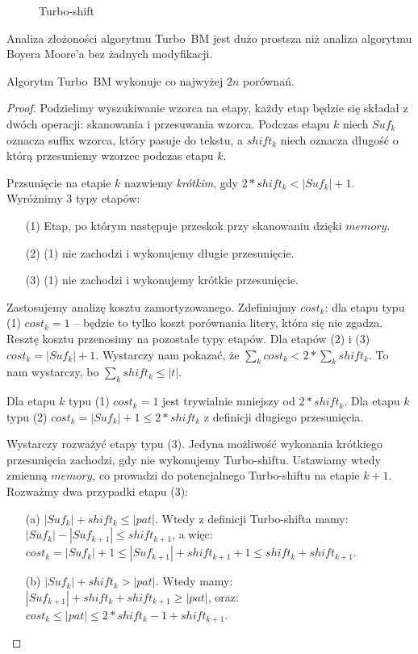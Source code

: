 \begin{figure}[h]
		
  \caption{Turbo-shift}
  \label{turboshift}
\end{figure}

Analiza złożoności algorytmu Turbo~BM jest dużo prostsza niż analiza algorytmu Boyera Moore'a bez żadnych modyfikacji.

\begin{theorem}{}{}
	Algorytm Turbo~BM wykonuje co najwyżej $2n$ porównań.
\end{theorem}

\begin{proof}
	Podzielimy wyszukiwanie wzorca na etapy, każdy etap będzie się składał z dwóch operacji: skanowania i przesuwania wzorca. Podczas etapu $k$ niech $Suf_k$ oznacza suffix wzorca, który pasuje do tekstu, a $shift_k$ niech oznacza długość o którą przesuniemy wzorzec podczas etapu $k$.

	Przsunięcie na etapie $k$ nazwiemy \emph{krótkim}, gdy $2*shift_k < |Suf_k| + 1$. Wyróżnimy 3 typy etapów:
	\begin{itemize}
		\item[(1)] Etap, po którym następuje przeskok przy skanowaniu dzięki $memory$.
		\item[(2)] (1) nie zachodzi i wykonujemy długie przesunięcie.
		\item[(3)] (1) nie zachodzi i wykonujemy krótkie przesunięcie. 
	\end{itemize}

	Zastosujemy analizę kosztu zamortyzowanego. Zdefiniujmy $cost_k$: dla etapu typu (1) $cost_k = 1$ -- będzie to tylko koszt porównania litery, która się nie zgadza. Resztę kosztu przenosimy na pozostałe typy etapów. Dla etapów (2) i (3) $cost_k = |Suf_k| + 1$. Wystarczy nam pokazać, że $\sum_k cost_k < 2* \sum_k shift_k$. To nam wystarczy, bo $\sum_k shift_k \leq |t|$.

	Dla etapu $k$ typu (1) $cost_k = 1$ jest trywialnie mniejszy od $2 * shift_k$. Dla etapu $k$ typu (2) $cost_k = |Suf_k| + 1 \leq 2 * shift_k$ z definicji długiego przesunięcia.

	Wystarczy rozważyć etapy typu (3). Jedyna możliwość wykonania krótkiego przesunięcia zachodzi, gdy nie wykonujemy Turbo-shiftu. Ustawiamy wtedy zmienną $memory$, co prowadzi do potencjalnego Turbo-shiftu na etapie $k+1$. Rozważmy dwa przypadki etapu (3):
	\begin{itemize}
		\item [(a)] $|Suf_k| + shift_k \leq |pat|$. Wtedy z definicji Turbo-shifta mamy: $|Suf_k| - |Suf_{k+1}| \leq shift_{k+1}$, a więc: $cost_k = |Suf_{k}|+1 \leq |Suf_{k+1}| + shift_{k+1} + 1 \leq shift_k + shift_{k+1}$.
		\item [(b)] $|Suf_k| + shift_k > |pat|$. Wtedy mamy: $|Suf_{k+1}| + shift_k + shift_{k+1} \geq |pat|$, oraz: $cost_k \leq |pat| \leq 2 * shift_k -1 + shift_{k+1}$.
	\end{itemize}


\end{proof}

